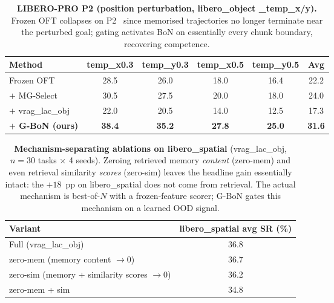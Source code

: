 \begin{table}[h]
\centering
\caption{\textbf{LIBERO-PRO P2 (position perturbation, libero\_object \_temp\_x/y).}
Frozen OFT collapses on
P2~\citep{libero_pro2025} since memorised trajectories no longer terminate
near the perturbed goal; gating activates BoN on essentially every chunk
boundary, recovering competence.}
\label{tab:lpro_p2}
\begin{tabular}{lccccc}
\toprule
Method & temp\_x0.3 & temp\_y0.3 & temp\_x0.5 & temp\_y0.5 & \textbf{Avg} \\
\midrule
Frozen OFT                        & 28.5 & 26.0 & 18.0 & 16.4 & 22.2 \\
$+$ MG-Select \citep{mgselect2026}     & 30.5 & 27.5 & 20.0 & 18.0 & 24.0 \\
$+$ vrag\_lac\_obj                & 22.0 & 20.5 & 14.0 & 12.5 & 17.3 \\
\textbf{$+$ G-BoN (ours)}         & \textbf{38.4} & \textbf{35.2} & \textbf{27.8} & \textbf{25.0} & \textbf{31.6} \\
\bottomrule
\end{tabular}
\end{table}

\begin{table}[h]
\centering
\caption{\textbf{Mechanism-separating ablations on libero\_spatial}
(vrag\_lac\_obj, $n=30$ tasks $\times$ 4 seeds). Zeroing retrieved memory
\emph{content} (zero-mem) and even retrieval similarity \emph{scores}
(zero-sim) leaves the headline gain essentially intact: the $+18$~pp on
libero\_spatial does not come from retrieval. The actual mechanism is
best-of-$N$ with a frozen-feature scorer; G-BoN gates this mechanism on
a learned OOD signal.}
\label{tab:abl_mech}
\begin{tabular}{lc}
\toprule
Variant & libero\_spatial avg SR (\%) \\
\midrule
Full (vrag\_lac\_obj)                           & 36.8 \\
zero-mem (memory content $\to 0$)               & 36.7 \\
zero-sim (memory + similarity scores $\to 0$)   & 36.2 \\
zero-mem + sim                                  & 34.8 \\
\bottomrule
\end{tabular}
\end{table}

